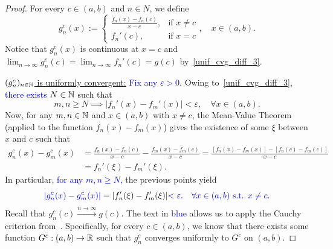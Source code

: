 \begin{proof}
	For every $c\in (a,b)$ and $n\in N$, we define
	\[
	g_n^c(x):= \left\{
	\begin{array}{cl}
		\frac{f_n(x)-f_n(c)}{x-c}, 	&\text{if }x\neq c 	\\
		f_n'(c), 	&\text{if }x=c
	\end{array}
	\right.,\quad x\in (a,b).
	\]
	Notice that $g_n^c(x)$ is continuous at $x=c$ and $\lim_{n\to\infty} g_n^c(c) = \lim_{n\to\infty}f_n'(c) = g(c)$ by~\ref{unif_cvg_diff_3}. 
	
	\ul{$(g_n^c)_{n\in\mathbb{N}}$ is uniformly convergent:} \textcolor{blue}{Fix any $\varepsilon>0$.} Owing to~\ref{unif_cvg_diff_3}, \textcolor{blue}{there exists $N\in \mathbb{N}$} such that
	\[
	m,n\ge N\implies |f_n'(x) - f_m'(x)|<\varepsilon,\quad \forall x\in (a,b).
	\]
	Now, for any $m,n\in\mathbb{N}$ and $x\in (a,b)$ with $x\neq c$, the Mean-Value Theorem (applied to the function $f_n(x) - f_m(x)$) gives the existence of some $\xi$ between $x$ and $c$ such that
	\begin{align*}
	g_n^c(x) - g_m^c(x) &= \frac{f_n(x)-f_n(c)}{x-c} - \frac{f_m(x)-f_m(c)}{x-c} = \frac{[f_n(x) - f_m(x)] - [f_n(c) - f_m(c)]}{x-c} 	\\
	&= f_n'(\xi) - f_m'(\xi).
	\end{align*}
	In particular, \textcolor{blue}{for any $m,n\ge N$,} the previous points yield
	\[
	\textcolor{blue}{|g_n^c(x) - g_m^c(x)|} = |f_n'(\xi) - f_m'(\xi)| \textcolor{blue}{< \varepsilon.\quad \forall x\in (a,b)\text{ s.t. }x\neq c.}
	\]
	Recall that $g_n^c(c) \overset{n\to \infty}{\to} g(c)$. The text in \textcolor{blue}{blue} allows us to apply the Cauchy criterion from~. Specifically, for every $c\in (a,b)$, we know that there exists some function $G^c:(a,b)\to \mathbb{R}$ such that $g_n^c$ converges uniformly to $G^c$ on $(a,b)$.
	

\end{proof}
